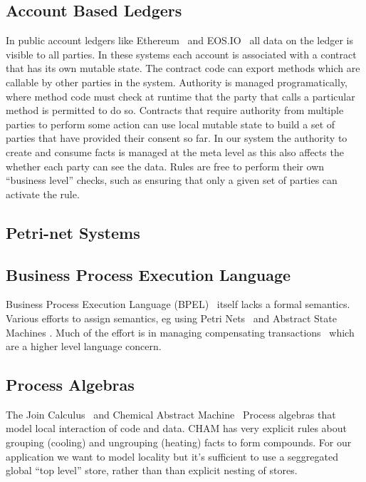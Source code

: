 \subsection{Account Based Ledgers}
In public account ledgers like Ethereum~\cite{Wood2014:Ethereum} and EOS.IO~\cite{Lee2018:EOSIO} all data on the ledger is visible to all parties. In these systems each account is associated with a contract that has its own mutable state. The contract code can export methods which are callable by other parties in the system. Authority is managed programatically, where method code must check at runtime that the party that calls a particular method is permitted to do so. Contracts that require authority from multiple parties to perform some action can use local mutable state to build a set of parties that have provided their consent so far. In our system the authority to create and consume facts is managed at the meta level as this also affects the whether each party can see the data. Rules are free to perform their own ``business level'' checks, such as ensuring that only a given set of parties can activate the rule.



\subsection{Petri-net Systems}



\subsection{Business Process Execution Language}
Business Process Execution Language (BPEL)~\cite{Andrews2003:BPEL} itself lacks a formal semantics. Various efforts to assign semantics, eg using Petri Nets~\cite{Lohmann2009:PetriBPEL} and Abstract State Machines \cite{Fahland2005:SemanticsBPEL}. Much of the effort is in managing compensating transactions~\cite{Colombo2011:Compensating} which are a higher level language concern.


\subsection{Process Algebras}
The Join Calculus~\cite{Cedric1996:Reflexive} and Chemical Abstract Machine~\cite{Berry1992:Chemical} Process algebras that model local interaction of code and data. CHAM has very explicit rules about grouping (cooling) and ungrouping (heating) facts to form compounds. For our application we want to model locality but it's sufficient to use a seggregated global ``top level'' store, rather than than explicit nesting of stores.


